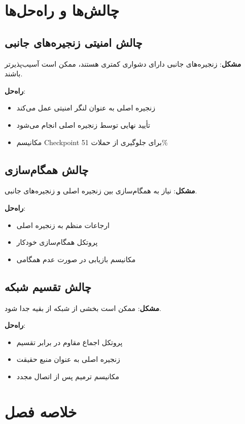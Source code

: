 \section{چالش‌ها و راه‌حل‌ها}

\subsection{چالش امنیتی زنجیره‌های جانبی}

\textbf{مشکل}: زنجیره‌های جانبی دارای دشواری کمتری هستند، ممکن است آسیب‌پذیرتر باشند.

\textbf{راه‌حل}:
\begin{itemize}
    \item زنجیره اصلی به عنوان لنگر امنیتی عمل می‌کند
    \item تأیید نهایی توسط زنجیره اصلی انجام می‌شود
    \item مکانیسم Checkpoint برای جلوگیری از حملات 51\%
\end{itemize}

\subsection{چالش همگام‌سازی}

\textbf{مشکل}: نیاز به همگام‌سازی بین زنجیره اصلی و زنجیره‌های جانبی.

\textbf{راه‌حل}:
\begin{itemize}
    \item ارجاعات منظم به زنجیره اصلی
    \item پروتکل همگام‌سازی خودکار
    \item مکانیسم بازیابی در صورت عدم همگامی
\end{itemize}

\subsection{چالش تقسیم شبکه }

\textbf{مشکل}: ممکن است بخشی از شبکه از بقیه جدا شود.

\textbf{راه‌حل}:
\begin{itemize}
    \item پروتکل اجماع مقاوم در برابر تقسیم
    \item زنجیره اصلی به عنوان منبع حقیقت
    \item مکانیسم ترمیم پس از اتصال مجدد
\end{itemize}

\section{خلاصه فصل}

